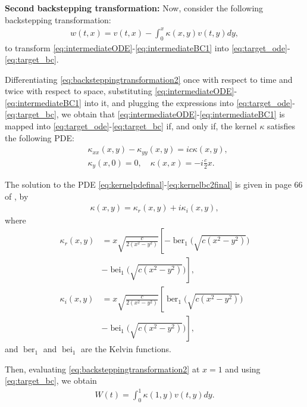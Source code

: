 \documentclass[letterpaper, 10 pt, conference]{ieeeconf}  %
\DeclareMathOperator{\ber}{ber}
\DeclareMathOperator{\bei}{bei}
\begin{document}
\textbf{Second backstepping transformation:} Now, consider the following backstepping transformation:
\begin{align}
    w(t,x) = v(t,x) - \int_{0}^{x}\kappa(x,y)v(t,y)dy, \label{eq:backsteppingtransformation2}
\end{align}
\noindent to transform \eqref{eq:intermediateODE}-\eqref{eq:intermediateBC1} into \eqref{eq:target_ode}-\eqref{eq:target_bc}.

Differentiating \eqref{eq:backsteppingtransformation2} once with respect to time and twice with respect to space, substituting \eqref{eq:intermediateODE}-\eqref{eq:intermediateBC1} into it, and plugging the expressions into \eqref{eq:target_ode}-\eqref{eq:target_bc}, we obtain that \eqref{eq:intermediateODE}-\eqref{eq:intermediateBC1} is mapped into \eqref{eq:target_ode}-\eqref{eq:target_bc} if, and only if, the kernel $\kappa$ satisfies the following PDE:
\begin{align}
    &\kappa_{xx}(x,y)-\kappa_{yy}(x,y) = ic\kappa (x,y),\label{eq:kernelpdefinal}\\
    &\kappa_{y}(x,0) = 0, \quad
    \kappa(x,x) = -i\frac{c}{2}x.\label{eq:kernelbc2final}
\end{align}

The solution to the PDE \eqref{eq:kernelpdefinal}-\eqref{eq:kernelbc2final} is given in page 66 of \cite{Krsti2008BoundaryCO}, by
\begin{align}
    \kappa(x,y) = \kappa_{r}(x,y) + i\kappa_{i}(x,y),
\end{align}
\noindent where 
\begin{align*}
    \kappa_{r}(x,y) &= x\sqrt{\frac{c}{2(x^2-y^2)}}\left[-\ber_{1}\biggl(\sqrt{c(x^2-y^2)}\biggl) \right.\\
    & - \left. \bei_{1}\biggl(\sqrt{c(x^2-y^2)}\biggl)\right],\\
    \kappa_{i}(x,y) &= x\sqrt{\frac{c}{2(x^2-y^2)}}\left[\ber_{1}\biggl(\sqrt{c(x^2-y^2)}\biggl) \right.\\
    & - \left. \bei_{1}\biggl(\sqrt{c(x^2-y^2)}\biggl) \right],
\end{align*}
and $\ber_{1}$ and $\bei_{1}$ are the Kelvin functions.

Then, evaluating \eqref{eq:backsteppingtransformation2} at $x=1$ and using \eqref{eq:target_bc}, we obtain 
\begin{align}
    W(t) = \int_{0}^{1}\kappa(1,y)v(t,y)dy. \label{eq:intermediatecontroller}
\end{align}
\end{document}
